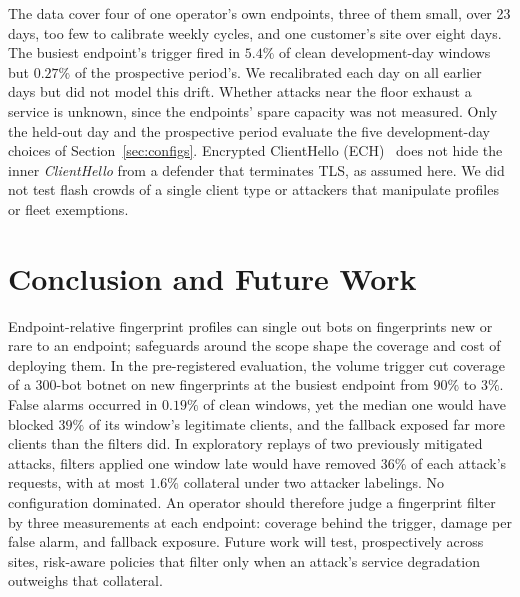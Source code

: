 \documentclass[conference,letterpaper,10pt]{IEEEtran}
\newcommand\1{\textit{(i)}}
\newcommand\2{\textit{(ii)}}
\newcommand\3{\textit{(iii)}}
\newcommand\4{\textit{(iv)}}
\newcommand\5{\textit{(v)}}
\newcommand\6{\textit{(vi)}}
\newcommand\7{\textit{(vii)}}
\newcommand\8{\textit{(viii)}}
\newcommand\9{\textit{(ix)}}
\begin{document}
The data cover four of one operator's own endpoints, three of them small, over 23 days, too few to calibrate weekly cycles, and one customer's site over eight days. The busiest endpoint's trigger fired in $5.4\%$ of clean development-day windows but $0.27\%$ of the prospective period's. We recalibrated each day on all earlier days but did not model this drift. Whether attacks near the floor exhaust a service is unknown, since the endpoints' spare capacity was not measured. Only the held-out day and the prospective period evaluate the five development-day choices of Section~\ref{sec:configs}.  Encrypted ClientHello (ECH)~\cite{ietf2026ech} does not hide the inner \textit{ClientHello} from a defender that terminates TLS, as assumed here. We did not test flash crowds of a single client type or attackers that manipulate profiles or fleet exemptions.




\section{Conclusion and Future Work}
\label{sec:conclusion}

Endpoint-relative fingerprint profiles can single out bots on fingerprints new or rare to an endpoint; safeguards around the scope shape the coverage and cost of deploying them. In the pre-registered evaluation, the volume trigger cut coverage of a 300-bot botnet on new fingerprints at the busiest endpoint from $90\%$ to $3\%$. False alarms occurred in $0.19\%$ of clean windows, yet the median one would have blocked $39\%$ of its window's legitimate clients, and the fallback exposed far more clients than the filters did. In exploratory replays of two previously mitigated attacks, filters applied one window late would have removed $36\%$ of each attack's requests, with at most $1.6\%$ collateral under two attacker labelings. No configuration dominated. An operator should therefore judge a fingerprint filter by three measurements at each endpoint: coverage behind the trigger, damage per false alarm, and fallback exposure. Future work will test, prospectively across sites, risk-aware policies that filter only when an attack's service degradation outweighs that collateral.
\end{document}

